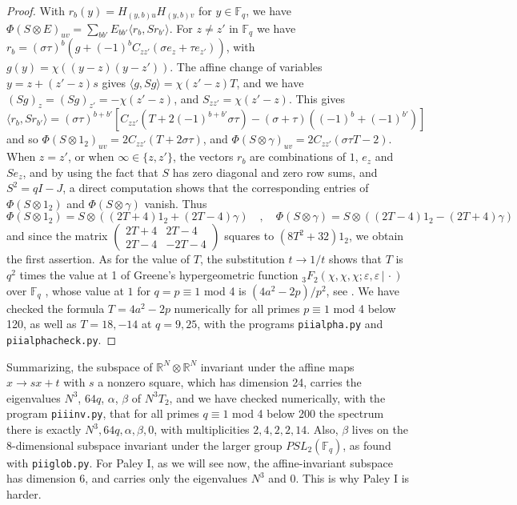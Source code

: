 \documentclass[11pt]{amsart}
\begin{document}
\begin{proof}
With $r_b(y)=H_{(y,b)u}H_{(y,b)v}$ for $y\in\mathbb F_q$, we have $\Phi(S\otimes E)_{uv}=\sum_{bb'}E_{bb'}\langle r_b,Sr_{b'}\rangle$. For $z\neq z'$ in $\mathbb F_q$ we have $r_b=(\sigma\tau)^b(g+(-1)^bC_{zz'}(\sigma e_z+\tau e_{z'}))$, with $g(y)=\chi((y-z)(y-z'))$. The affine change of variables $y=z+(z'-z)s$ gives $\langle g,Sg\rangle=\chi(z'-z)T$, and we have $(Sg)_z=(Sg)_{z'}=-\chi(z'-z)$, and $S_{zz'}=\chi(z'-z)$. This gives
$$\langle r_b,Sr_{b'}\rangle=(\sigma\tau)^{b+b'}\left[C_{zz'}(T+2(-1)^{b+b'}\sigma\tau)-(\sigma+\tau)((-1)^b+(-1)^{b'})\right]$$
and so $\Phi(S\otimes1_2)_{uv}=2C_{zz'}(T+2\sigma\tau)$, and $\Phi(S\otimes\gamma)_{uv}=2C_{zz'}(\sigma\tau T-2)$. When $z=z'$, or when $\infty\in\{z,z'\}$, the vectors $r_b$ are combinations of $1$, $e_z$ and $Se_z$, and by using the fact that $S$ has zero diagonal and zero row sums, and $S^2=qI-J$, a direct computation shows that the corresponding entries of $\Phi(S\otimes1_2)$ and $\Phi(S\otimes\gamma)$ vanish. Thus
$$\Phi(S\otimes1_2)=S\otimes((2T+4)1_2+(2T-4)\gamma)\quad,\quad\Phi(S\otimes\gamma)=S\otimes((2T-4)1_2-(2T+4)\gamma)$$
and since the matrix $\begin{pmatrix}2T+4&2T-4\\2T-4&-2T-4\end{pmatrix}$ squares to $(8T^2+32)1_2$, we obtain the first assertion. As for the value of $T$, the substitution $t\to1/t$ shows that $T$ is $q^2$ times the value at 1 of Greene's hypergeometric function ${}_3F_2(\chi,\chi,\chi;\varepsilon,\varepsilon\,|\,\cdot)$ over $\mathbb F_q$ \cite{gre}, whose value at $1$ for $q=p\equiv1$ mod 4 is $(4a^2-2p)/p^2$, see \cite{ono}. We have checked the formula $T=4a^2-2p$ numerically for all primes $p\equiv1$ mod 4 below 120, as well as $T=18,-14$ at $q=9,25$, with the programs \texttt{piialpha.py} and \texttt{piialphacheck.py}.
\end{proof}

Summarizing, the subspace of $\mathbb R^N\otimes\mathbb R^N$ invariant under the affine maps $x\to sx+t$ with $s$ a nonzero square, which has dimension 24, carries the eigenvalues $N^3$, $64q$, $\alpha$, $\beta$ of $N^3T_2$, and we have checked numerically, with the program \texttt{piiinv.py}, that for all primes $q\equiv1$ mod 4 below 200 the spectrum there is exactly $N^3,64q,\alpha,\beta,0$, with multiplicities $2,4,2,2,14$. Also, $\beta$ lives on the 8-dimensional subspace invariant under the larger group $PSL_2(\mathbb F_q)$, as found with \texttt{piiglob.py}. For Paley I, as we will see now, the affine-invariant subspace has dimension 6, and carries only the eigenvalues $N^3$ and $0$. This is why Paley I is harder.
\end{document}
